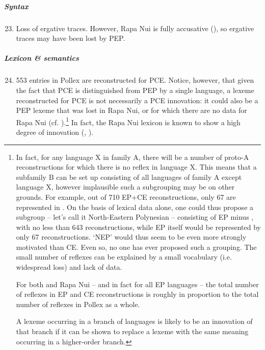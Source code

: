 \subparagraph{Syntax}

\begin{enumerate}
\setcounter{enumi}{22}
\item 
Loss of ergative traces. However, Rapa Nui is fully accusative (), so ergative traces may have been lost by PEP.   

\end{enumerate}

\subparagraph{Lexicon \& semantics}

\begin{enumerate}
\setcounter{enumi}{23}
\item 
553 entries in Pollex are reconstructed for PCE. Notice, however, that given the fact that PCE is distinguished from PEP by a single language, a lexeme reconstructed for PCE is not necessarily a PCE innovation: it could also be a PEP lexeme that was lost in Rapa Nui, or for which there are no data for Rapa Nui (cf. \citealt[445]{Geraghty2009}).\footnote{\label{fn:17}In fact, for any language X in family A, there will be a number of proto-A reconstructions for which there is no reflex in language X. This means that a subfamily B can be set up consisting of all languages of family A except language X, however implausible such a subgrouping may be on other grounds. For example, out of 710 EP+CE reconstructions, only 67 are represented in . On the basis of lexical data alone, one could thus propose a subgroup – let’s call it North-Eastern Polynesian – consisting of EP minus , with no less than 643 reconstructions, while EP itself would be represented by only 67 reconstructions. ‘NEP’ would thus seem to be even more strongly motivated than CE. Even so, no one has ever proposed such a grouping. The small number of  reflexes can be explained by a small vocabulary (i.e. widespread loss) and lack of data.

For both  and Rapa Nui – and in fact for all EP languages – the total number of reflexes in EP and CE reconstructions is roughly in proportion to the total number of reflexes in Pollex as a whole.

A lexeme occurring in a branch of languages is likely to be an innovation of that branch if it can be shown to replace a lexeme with the same meaning occurring in a higher-order branch.} In fact, the Rapa Nui lexicon is known to show a high degree of innovation (\citealt[45]{LangdonTryon1983}, \citealt[36]{Bergmann1963}).   


\end{enumerate}
